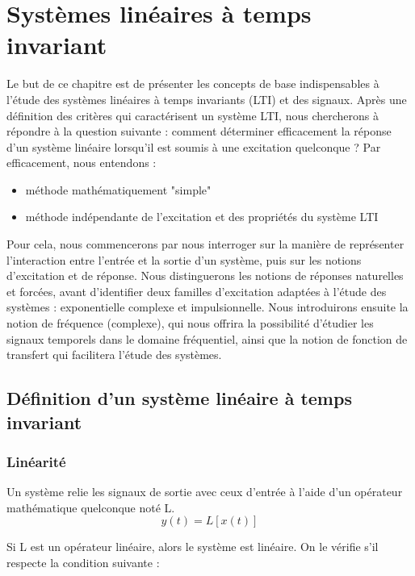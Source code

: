 \chapter{Systèmes linéaires à temps invariant}
	Le but de ce chapitre est de présenter les concepts de base indispensables à l'étude des systèmes linéaires à temps invariants (LTI) et des signaux.
	Après une définition des critères qui caractérisent un système LTI, nous chercherons à répondre à la question suivante :
	comment déterminer efficacement la réponse d'un système linéaire lorsqu'il est soumis à une excitation quelconque ? Par efficacement, nous entendons :
	\begin{itemize}
		\item méthode mathématiquement "simple"
		\item méthode indépendante de l'excitation et des propriétés du système LTI
	\end{itemize}
	
	\vspace{1\baselineskip}
	
	Pour cela, nous commencerons par nous interroger sur la manière de représenter l'interaction entre l'entrée et la sortie d'un système, puis sur les notions d'excitation et de réponse. Nous distinguerons les notions de réponses naturelles et forcées, avant d'identifier deux familles d'excitation adaptées à l'étude des systèmes : exponentielle complexe et impulsionnelle. Nous introduirons ensuite la notion de fréquence (complexe), qui nous offrira la possibilité d'étudier les signaux temporels dans le domaine fréquentiel, ainsi que la notion de fonction de transfert qui facilitera l'étude des systèmes.
	
	
	\section{Définition d'un système linéaire à temps invariant}

	\subsection{Linéarité} 
	Un système relie les signaux de sortie avec ceux d'entrée à l'aide d'un opérateur mathématique quelconque noté L.
	\begin{equation}\label{key}
	y(t) = L[x(t)] 
	\end{equation}
		
	Si L est un opérateur linéaire, alors le système est linéaire. On le vérifie s'il respecte la condition suivante : 
	
